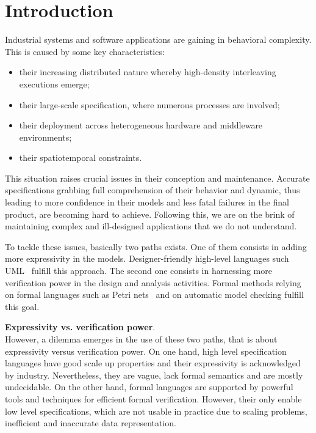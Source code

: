 \section{Introduction}\label{sec:introduction}

Industrial systems and software applications are gaining in
behavioral complexity. This is caused by some key characteristics: 
\begin{itemize}
	\item their increasing distributed nature whereby high-density interleaving executions emerge;
	\item their large-scale specification, where numerous processes 
	are involved;
	\item their deployment across heterogeneous hardware and middleware environments;
	\item their spatiotemporal constraints.
\end{itemize}

This situation raises crucial issues in their conception
and maintenance. Accurate specifications grabbing full comprehension
of their behavior and dynamic, thus leading to more confidence in their models
and less fatal failures in the final product, are becoming hard to achieve. Following this, we are on the brink of maintaining
complex and ill-designed applications that we do not understand.

To tackle these issues, basically two paths exists.
One of them consists in adding more expressivity in the models.
Designer-friendly high-level languages such UML~\cite{uml212super} 
fulfill this approach.
The second one consists in harnessing more verification power in 
the design and analysis activities. Formal methods relying on 
formal languages such as Petri nets~\cite{Girault:2003fk} and on automatic model checking
fulfill this goal. 

\textbf{Expressivity vs. verification power}.\\
However, a dilemma emerges in the use of these two paths,
that is about expressivity versus verification power. 
On one hand, high level specification languages have good scale up
properties and their expressivity is acknowledged by industry.
Nevertheless, they are vague, lack formal semantics and are
mostly undecidable. 
On the other hand, formal languages are supported by powerful
tools and techniques for efficient formal verification.
However, their only enable low level specifications, which are
not usable in practice due to scaling problems, inefficient and
inaccurate data representation. 

